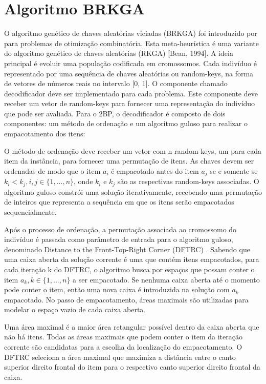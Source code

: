 \documentclass[article]{rian_article}
\begin{document}
\section{Algoritmo BRKGA}\label{sec:corte}
O algoritmo genético de chaves aleatórias viciadas (BRKGA) foi introduzido por \citet{resende2011} para problemas de otimização combinatória. Esta meta-heurística é uma variante do algoritmo genético de chaves aleatórias (RKGA) [Bean, 1994]. 
A ideia principal é evoluir uma população codificada em cromossomos. Cada indivíduo é representado por uma sequência de chaves aleatórias ou random-keys, na forma de vetores de números reais no intervalo [0, 1].
O componente chamado decodificador deve ser implementado para cada problema. Este componente deve receber um vetor de random-keys para fornecer uma representação do indivíduo que pode ser avaliada. Para o 2BP, o decodificador é composto de dois componentes: um método de ordenação e um algoritmo guloso para realizar o empacotamento dos itens:

O método de ordenação deve receber um vetor com n random-keys, um para cada item da instância, para fornecer uma permutação de itens. As chaves devem ser ordenadas de modo que o item $a_{i}$ é empacotado antes do item $a_{j}$ se e somente se $k_{i} < k_{j}, {i}, {j} \in \{1, ..., {n}\}$, onde $k_{i}$ e $k_{j}$ são as respectivas random-keys associadas.
O algoritmo guloso constrói uma solução iterativamente, recebendo uma permutação de inteiros que representa a sequência em que os itens serão empacotados sequencialmente.

Após o processo de ordenação, a permutação associada ao cromossomo do indivíduo é passada como parâmetro de entrada para o algoritmo guloso, denominado Distance to the Front-Top-Right Corner (DFTRC) \citep{resende2013}. Sabendo que uma caixa aberta da solução corrente é uma que contém itens empacotados, para cada iteração {k} do DFTRC, o algoritmo busca por espaços que possam conter o item  $a_{k}, {k} \in \{1, ..., {n}\}$ a ser empacotado. Se nenhuma caixa aberta até o momento pode conter o item, então uma nova caixa é introduzida na solução com $a_{k}$ empacotado. No passo de empacotamento, áreas maximais são utilizadas para modelar o espaço vazio de cada caixa aberta. 

Uma área maximal é a maior área retangular possível dentro da caixa aberta que não há itens. Todas as áreas maximais que podem conter o item da iteração corrente são candidatas para a escolha da localização do empacotamento. O DFTRC seleciona a área maximal que maximiza a distância entre o canto superior direito frontal do item para o respectivo canto superior direito frontal da caixa.
\end{document}
